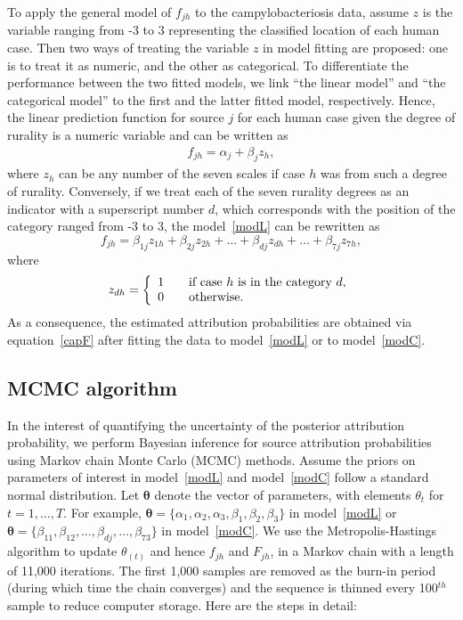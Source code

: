\documentclass[AMA,STIX1COL]{WileyNJD-v2}
\begin{document}
To apply the general model of $f_{jh}$ to the campylobacteriosis data, assume $z$ is the variable ranging from -3 to 3 representing the classified location of each human case. Then two ways of treating the variable $z$ in model fitting are proposed: one is to treat it as numeric, and the other as categorical. To differentiate the performance between the two fitted models, we link ``the linear model'' and ``the categorical model'' to the first and the latter fitted model, respectively. Hence, the linear prediction function for source $j$ for each human case given the degree of rurality is a numeric variable and can be written as
\begin{align}
  f_{jh} = \alpha_{j} + \beta_{j} z_{h},
  \label{modL}
\end{align}
where $z_{h}$ can be any number of the seven scales if case $h$ was from such a degree of rurality. Conversely, if we treat each of the seven rurality degrees as an indicator with a superscript number $d$, which corresponds with the position of the category ranged from -3 to 3, the model~\eqref{modL} can be rewritten as
\begin{equation}
  f_{jh} = \beta_{1j} z_{1h}+ \beta_{2j} z_{2h} + \ldots + \beta_{dj} z_{dh} + \ldots +  \beta_{7j} z_{7h},
  \label{modC}
\end{equation}
where
\begin{equation*}
z_{dh} =
\left\{\begin{array}{rcl}
1 && \mbox{if case $h$ is in the category $d$,} \notag \\ 0 && \mbox{otherwise}.
\end{array}\right.
\end{equation*}
As a consequence, the estimated attribution probabilities are obtained via equation~\eqref{capF} after fitting the data to model~\eqref{modL} or to model~\eqref{modC}.

\subsection{MCMC algorithm}
In the interest of quantifying the uncertainty of the posterior attribution probability, we perform Bayesian inference for source attribution probabilities using Markov chain Monte Carlo (MCMC) methods. Assume the priors on parameters of interest in model~\eqref{modL} and model~\eqref{modC} follow a standard normal distribution. Let $\boldsymbol{\theta}$ denote the vector of parameters, with elements $\theta_{t}$ for $t=1, \ldots, T$. For example, $\boldsymbol{\theta}=\{\alpha_1, \alpha_2, \alpha_3, \beta_1, \beta_2, \beta_3\}$ in model~\eqref{modL} or $\boldsymbol{\theta}=\{\beta_{11}, \beta_{12}, \ldots, \beta_{dj}, \ldots, \beta_{73}\}$ in model~\eqref{modC}. We use the Metropolis-Hastings algorithm to update $\theta_{(t)}$ and hence $f_{jh}$ and $ F_{jh}$, in a Markov chain with a length of 11,000 iterations. The first 1,000 samples are removed as the burn-in period (during which time the chain converges) and the sequence is thinned every 100$^{th}$ sample to reduce computer storage. Here are the steps in detail:
\end{document}

